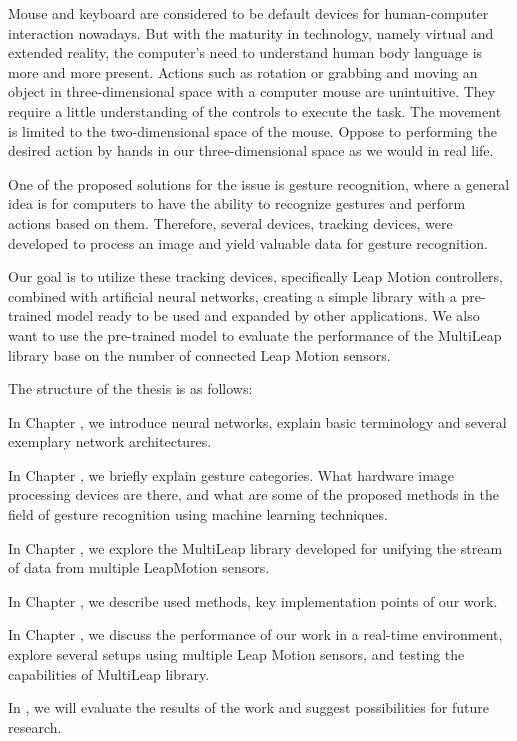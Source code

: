 Mouse and keyboard are considered to be default devices for human-computer interaction nowadays. But with the maturity in technology, namely virtual and extended reality, the computer's need to understand human body language is more and more present. Actions such as rotation or grabbing and moving an object in three-dimensional space with a computer mouse are unintuitive. They require a little understanding of the controls to execute the task. The movement is limited to the two-dimensional space of the mouse. Oppose to performing the desired action by hands in our three-dimensional space as we would in real life.

One of the proposed solutions for the issue is gesture recognition, where a general idea is for computers to have the ability to recognize gestures and perform actions based on them. Therefore, several devices, tracking devices, were developed to process an image and yield valuable data for gesture recognition.

Our goal is to utilize these tracking devices, specifically Leap Motion controllers, combined with artificial neural networks, creating a simple library with a pre-trained model ready to be used and expanded by other applications. We also want to use the pre-trained model to evaluate the performance of the MultiLeap library base on the number of connected Leap Motion sensors.

The structure of the thesis is as follows:
\begin{description}

    \item In Chapter , we introduce neural networks, explain basic terminology and several exemplary network architectures.
    
    \item In Chapter , we briefly explain gesture categories. What hardware image processing devices are there, and what are some of the proposed methods in the field of gesture recognition using machine learning techniques.
    
    \item In Chapter , we explore the MultiLeap library developed for unifying the stream of data from multiple LeapMotion sensors.
    
    \item In Chapter , we describe used methods, key implementation points of our work.
    
    \item In Chapter , we discuss the performance of our work in a real-time environment, explore several setups using multiple Leap Motion sensors, and testing the capabilities of MultiLeap library.

    \item In , we will evaluate the results of the work and suggest possibilities for future research.
\end{description}